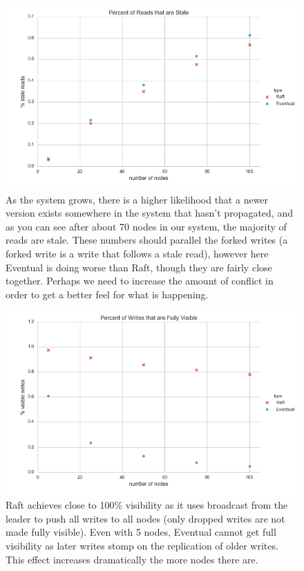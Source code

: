\documentclass[11pt,letterpaper]{article}
\begin{document}
\begin{figure}[!h]
    \centering
        \includegraphics[width=\textwidth]{figures/stale_reads.png}
        \caption{\textsf{As the system grows, there is a higher likelihood that a newer version exists somewhere in the system that hasn't propagated, and as you can see after about 70 nodes in our system, the majority of reads are stale. These numbers should parallel the forked writes (a forked write is a write that follows a stale read), however here Eventual is doing worse than Raft, though they are fairly close together. Perhaps we need to increase the amount of conflict in order to get a better feel for what is happening.}}
        \label{fig:stale_reads}
\end{figure}

\begin{figure}[!h]
    \centering
        \includegraphics[width=\textwidth]{figures/visible_writes.png}
        \caption{\textsf{Raft achieves close to 100\% visibility as it uses broadcast from the leader to push all writes to all nodes (only dropped writes are not made fully visible). Even with 5 nodes, Eventual cannot get full visibility as later writes stomp on the replication of older writes. This effect increases dramatically the more nodes there are.}}
        \label{fig:visible_writes}
\end{figure}
\end{document}
